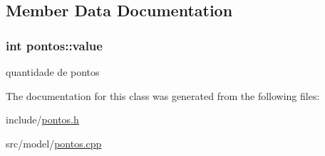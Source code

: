 \subsection{Member Data Documentation}
\subsubsection[{\texorpdfstring{value}{value}}]{\setlength{\rightskip}{0pt plus 5cm}int pontos\+::value\hspace{0.3cm}{\ttfamily [private]}}\hypertarget{classpontos_a776f5643630f9aec273380a31d0e6e47}{}\label{classpontos_a776f5643630f9aec273380a31d0e6e47}
quantidade de pontos 

The documentation for this class was generated from the following files\+:\begin{DoxyCompactItemize}
\item 
include/\hyperlink{pontos_8h}{pontos.\+h}\item 
src/model/\hyperlink{pontos_8cpp}{pontos.\+cpp}\end{DoxyCompactItemize}
